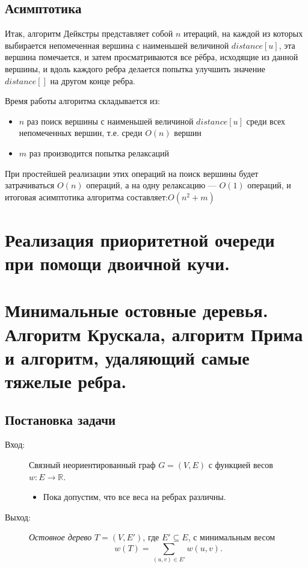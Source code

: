 \documentclass[a4paper,12pt]{article}
\begin{document}
\subsection{Асимптотика}

Итак, алгоритм Дейкстры представляет собой $n$ итераций, на каждой из которых выбирается непомеченная вершина с наименьшей величиной $distance[u]$, эта вершина помечается, и затем просматриваются все рёбра, исходящие из данной вершины, и вдоль каждого ребра делается попытка улучшить значение $distance[]$ на другом конце ребра.

Время работы алгоритма складывается из:
\begin{itemize}
    \item $n$ раз поиск вершины с наименьшей величиной $distance[u]$ среди всех непомеченных вершин, т.е. среди $O(n)$ вершин
    \item $m$ раз производится попытка релаксаций
\end{itemize}
При простейшей реализации этих операций на поиск вершины будет затрачиваться $O(n)$ операций, а на одну релаксацию — $O(1)$ операций, и итоговая асимптотика алгоритма составляет:$O(n^2+m)$ 



\newpage
\section{Реализация приоритетной очереди при помощи двоичной кучи.}
\newpage
\section{Минимальные остовные деревья. Алгоритм Крускала, алгоритм Прима и алгоритм, удаляющий самые тяжелые ребра.}

\subsection{Постановка задачи}
	\begin{description}
		\item[Вход:] Связный неориентированный граф $G = (V, E)$ с функцией весов $w: E \to \mathbb{R}$.
		\begin{itemize}
			\item Пока допустим, что все веса на ребрах различны.
		\end{itemize}
		\item[Выход:] \emph{Остовное дерево} $T = (V, E')$, где $E' \subseteq E$, с минимальным весом
		\[w(T) = \sum_{(u, v) \in E'}w(u, v).\]
	\end{description}
\end{document}
